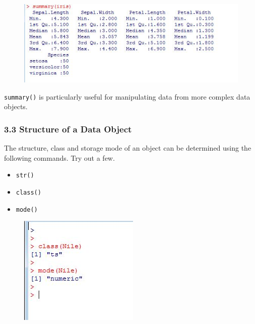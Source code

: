 \documentclass{beamer}
\begin{document}
 	\begin{frame}
 		
 		
 		\begin{figure}
 			\centering
 			\includegraphics[width=0.99\linewidth]{images/irissummary}
 			
 		\end{figure}
 		\texttt{summary()} is particularly useful for manipulating data from more complex data objects.
 		
 	\end{frame}
 	\begin{frame}
 		
 		\frametitle{3.3 Structure of a Data Object}
 		\large
 		The structure, class and storage mode of an object can be determined using the following
 		commands. Try out a few.
 		\begin{itemize}
 			\item  \texttt{str()}
 			\item  \texttt{class()}
 			\item  \texttt{mode()}
 		\end{itemize}
 		
 		
 	\end{frame}
 	\begin{frame}
 		\begin{figure}
 			\centering
 			\includegraphics[width=0.7\linewidth]{images/classnile}
 			\caption{}
 			\label{fig:classnile}
 		\end{figure}
 		
 		
 	\end{frame}
\end{document}
